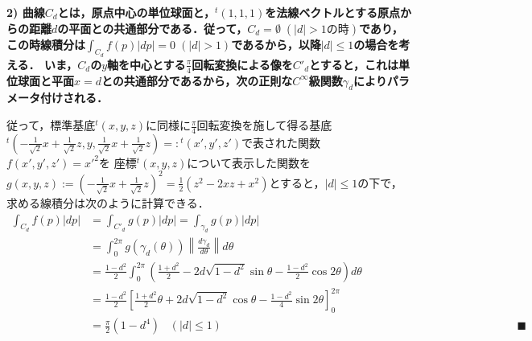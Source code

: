 \documentclass[dvipdfmx,a4paper,uplatex]{jsarticle}
\begin{document}
\bf{2)} 曲線$C_d$とは，原点中心の単位球面と，${}^t(1,1,1)$を法線ベクトルとする原点からの距離$d$の平面との共通部分である．従って，$C_d=\emptyset\;(|d|>1の時)$であり，この時線積分は$\int_{C_d}f(p)|dp|=0\;(|d|>1)$であるから，以降$|d|\le 1$の場合を考える．
いま，$C_d$の$y$軸を中心とする$\frac{\pi}{4}$回転変換による像を$C'_d$とすると，これは単位球面と平面$x=d$との共通部分であるから，次の正則な$C^\infty$級関数$\gamma_d$によりパラメータ付けされる．
\begin{center}
\end{center}
従って，標準基底${}^t(x,y,z)$に同様に$\frac{\pi}{4}$回転変換を施して得る基底${}^t\left(-\frac{1}{\sqrt{2}}x+\frac{1}{\sqrt{2}}z,y,\frac{1}{\sqrt{2}}x+\frac{1}{\sqrt{2}}z\right)=:{}^t(x',y',z')$で表された関数$f(x',y',z')=x'^2$を
座標${}^t(x,y,z)$について表示した関数を$g(x,y,z):=\left(-\frac{1}{\sqrt{2}}x+\frac{1}{\sqrt{2}}z\right)^2=\frac{1}{2}(z^2-2xz+x^2)$とすると，$|d|\le 1$の下で，求める線積分は次のように計算できる．
\begin{align*}
    \int_{C_d}f(p)|dp| &= \int_{C'_d}g(p)|dp| = \int_{\gamma_d}g(p)|dp| \\
    &= \int^{2\pi}_0 g(\gamma_d(\theta))\left\| \frac{d\gamma_d}{d\theta} \right\|d\theta \\
    &= \frac{1-d^2}{2}\int^{2\pi}_0\left( \frac{1+d^2}{2} -2d\sqrt{1-d^2}\sin\theta - \frac{1-d^2}{2}\cos 2\theta \right)d\theta \\
    &= \frac{1-d^2}{2}\left[ \frac{1+d^2}{2}\theta + 2d\sqrt{1-d^2}\cos\theta - \frac{1-d^2}{4}\sin 2\theta \right]^{2\pi}_0 \\
    &= \frac{\pi}{2}(1-d^4)\;\;\;(|d|\le 1)\hspace{11cm}\blacksquare
\end{align*}
\clearpage
\end{document}
